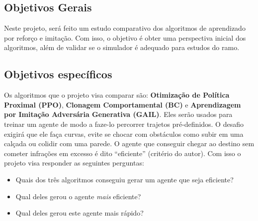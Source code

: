 \subsection*{Objetivos Gerais}
Neste projeto, será feito um estudo comparativo dos algoritmos de aprendizado por reforço e imitação. Com isso, o objetivo é obter uma perspectiva inicial dos algoritmos, além de validar se o simulador é adequado para estudos do ramo.

\subsection*{Objetivos específicos}
Os algoritmos que o projeto visa comparar são: \textbf{Otimização de Política Proximal (PPO)}, \textbf{Clonagem Comportamental (BC)} e \textbf{Aprendizagem por Imitação Adversária Generativa (GAIL)}. Eles serão usados para treinar um agente de modo a faze-lo percorrer trajetos pré-definidos. O desafio exigirá que ele faça curvas, evite se chocar com obstáculos como subir em uma calçada ou colidir com uma parede. O agente que conseguir chegar ao destino sem cometer infrações em excesso é dito ``eficiente'' (critério do autor). Com isso o projeto visa responder as seguintes perguntas:

\begin{itemize}
    \item Quais dos três algoritmos conseguiu gerar um agente que seja eficiente?
    \item Qual deles gerou o agente \textit{mais} eficiente?
    \item Qual deles gerou este agente mais rápido?
\end{itemize}
